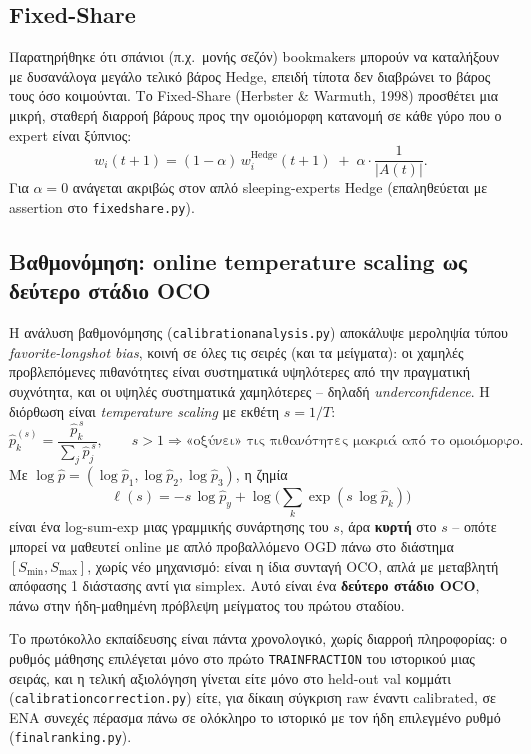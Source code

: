\documentclass[11pt,a4paper]{article}
\newcommand{\file}[1]{\texttt{#1}}
\newcommand{\var}[1]{\texttt{#1}}
\renewcommand{\_}{\oldunderscore\allowbreak}
\begin{document}
\subsection{Fixed-Share}

Παρατηρήθηκε ότι σπάνιοι (π.χ.\ μονής σεζόν) bookmakers μπορούν να καταλήξουν με
δυσανάλογα μεγάλο τελικό βάρος Hedge, επειδή τίποτα δεν διαβρώνει το βάρος τους όσο
κοιμούνται. Το Fixed-Share (Herbster \& Warmuth, 1998) προσθέτει μια μικρή, σταθερή διαρροή
βάρους προς την ομοιόμορφη κατανομή σε κάθε γύρο που ο expert είναι ξύπνιος:
\begin{equation}
  w_i(t+1) = (1-\alpha)\, w_i^{\text{Hedge}}(t+1) \;+\; \alpha \cdot \frac{1}{|A(t)|}.
\end{equation}
Για $\alpha=0$ ανάγεται ακριβώς στον απλό sleeping-experts Hedge (επαληθεύεται με assertion
στο \file{fixed\_share.py}).

\subsection{Βαθμονόμηση: online temperature scaling ως δεύτερο στάδιο OCO}
\label{sec:calib-theory}

Η ανάλυση βαθμονόμησης (\file{calibration\_analysis.py}) αποκάλυψε μεροληψία τύπου
\emph{favorite-longshot bias}, κοινή σε όλες τις σειρές (και τα μείγματα): οι χαμηλές
προβλεπόμενες πιθανότητες είναι συστηματικά υψηλότερες από την πραγματική συχνότητα, και οι
υψηλές συστηματικά χαμηλότερες -- δηλαδή \emph{underconfidence}. Η διόρθωση είναι
\emph{temperature scaling} με εκθέτη $s=1/T$:
\begin{equation}
  \hat p_k^{(s)} = \frac{\hat p_k^{\,s}}{\sum_j \hat p_j^{\,s}}, \qquad s>1 \Rightarrow
  \text{«οξύνει» τις πιθανότητες μακριά από το ομοιόμορφο.}
\end{equation}
Με $\log\hat p = (\log\hat p_1,\log\hat p_2,\log\hat p_3)$, η ζημία
\begin{equation}
  \ell(s) = -s\,\log\hat p_y + \log\!\Big(\sum_k \exp(s\,\log\hat p_k)\Big)
\end{equation}
είναι ένα log-sum-exp μιας γραμμικής συνάρτησης του $s$, άρα \textbf{κυρτή} στο $s$ -- οπότε
μπορεί να μαθευτεί online με απλό προβαλλόμενο OGD πάνω στο διάστημα $[S_{\min}, S_{\max}]$,
χωρίς νέο μηχανισμό: είναι η ίδια συνταγή OCO, απλά με μεταβλητή απόφασης 1 διάστασης αντί
για simplex. Αυτό είναι ένα \textbf{δεύτερο στάδιο OCO}, πάνω στην ήδη-μαθημένη πρόβλεψη
μείγματος του πρώτου σταδίου.

Το πρωτόκολλο εκπαίδευσης είναι πάντα χρονολογικό, χωρίς διαρροή πληροφορίας: ο ρυθμός
μάθησης επιλέγεται μόνο στο πρώτο \var{TRAIN\_FRACTION} του ιστορικού μιας σειράς, και η
τελική αξιολόγηση γίνεται είτε μόνο στο held-out val κομμάτι
(\file{calibration\_correction.py}) είτε, για δίκαιη σύγκριση raw έναντι calibrated, σε ΕΝΑ
συνεχές πέρασμα πάνω σε ολόκληρο το ιστορικό με τον ήδη επιλεγμένο ρυθμό
(\file{final\_ranking.py}).
\end{document}
